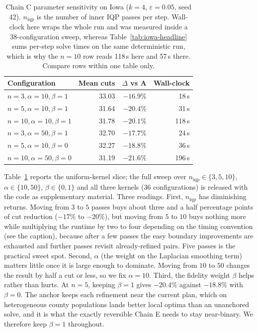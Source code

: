 \documentclass[11pt]{article}
\begin{document}
\begin{table}[htbp]
\centering
\small
\begin{tabular}{lrrr}
\toprule
Configuration & Mean cuts & $\Delta$ vs A & Wall-clock \\
\midrule
$n = 3, \alpha = 10, \beta = 1$  & 33.03 & $-16.9\%$ & 18\,s \\
$n = 5, \alpha = 10, \beta = 1$  & 31.64 & $-20.4\%$ & 31\,s \\
$n = 10, \alpha = 10, \beta = 1$ & 31.78 & $-20.1\%$ & 118\,s \\
$n = 3, \alpha = 50, \beta = 1$  & 32.70 & $-17.7\%$ & 24\,s \\
$n = 5, \alpha = 10, \beta = 0$  & 32.27 & $-18.8\%$ & 36\,s \\
$n = 10, \alpha = 50, \beta = 0$ & 31.19 & $-21.6\%$ & 196\,s \\
\bottomrule
\end{tabular}
\caption{Chain C parameter sensitivity on Iowa ($k = 4$,
  $\varepsilon = 0.05$, seed 42). $n_{\mathrm{iqp}}$ is the number of
  inner IQP passes per step. Wall-clock here wraps the whole run and
  was measured inside a 38-configuration sweep, whereas
  Table~\ref{tab:iowa-headline} sums per-step solve times on the same
  deterministic run, which is why the $n = 10$ row reads 118\,s here
  and 57\,s there. Compare rows within one table only.}\label{tab:sensitivity}
\end{table}

Table~\ref{tab:sensitivity} reports the uniform-kernel slice; the
full sweep over $n_{\mathrm{iqp}} \in \{3,5,10\}$,
$\alpha \in \{10,50\}$, $\beta \in \{0,1\}$ and all three kernels
(36 configurations) is released with the code as supplementary
material. Three readings. First, $n_{\mathrm{iqp}}$ has diminishing
returns.
Moving from $3$ to $5$ passes buys about three and a half percentage
points of cut reduction ($-17\%$ to $-20\%$), but moving from $5$ to
$10$ buys nothing more while multiplying the runtime by two to four
depending on the timing convention (see the caption), because after a
few passes the easy boundary improvements are exhausted and further
passes revisit already-refined pairs. Five passes is the practical
sweet spot. Second, $\alpha$ (the weight on the Laplacian smoothing
term) matters little once it is large enough to dominate. Moving from
$10$ to $50$ changes the result by half a cut or less, so we fix
$\alpha = 10$. Third, the
fidelity weight $\beta$ helps rather than hurts. At $n = 5$, keeping
$\beta = 1$ gives $-20.4\%$ against $-18.8\%$ with $\beta = 0$. The
anchor keeps each refinement near the current plan, which on
heterogeneous county populations lands better local optima than an
unanchored solve, and it is what the exactly reversible Chain E needs
to stay near-binary. We therefore keep $\beta = 1$ throughout.
\end{document}

